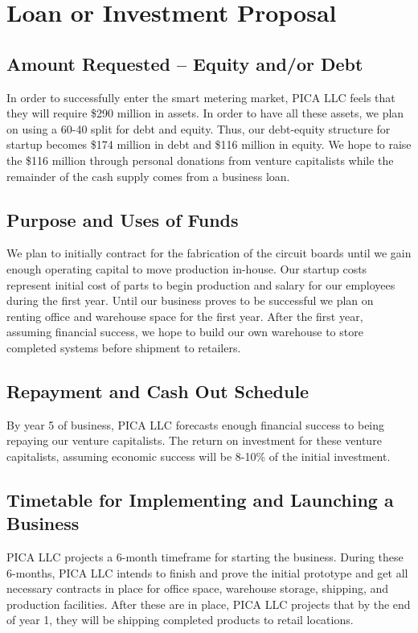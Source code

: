 \section{Loan or Investment Proposal}

\subsection{Amount Requested -- Equity and/or Debt}
In order to successfully enter the smart metering market, PICA LLC feels that they will require \$290 million in assets. In order to have all these assets, we plan on using a 60-40 split for debt and equity. Thus, our debt-equity structure for startup becomes \$174 million in debt and \$116 million in equity. We hope to raise the \$116 million through personal donations from venture capitalists while the remainder of the cash supply comes from a business loan.

\subsection{Purpose and Uses of Funds}
We plan to initially contract for the fabrication of the circuit boards until we gain enough operating capital to move production in-house. Our startup costs represent initial cost of parts to begin production and salary for our employees during the first year. Until our business proves to be successful we plan on renting office and warehouse space for the first year. After the first year, assuming financial success, we hope to build our own warehouse to store completed systems before shipment to retailers.

\subsection{Repayment and Cash Out Schedule}
By year 5 of business, PICA LLC forecasts enough financial success to being repaying our venture capitalists. The return on investment for these venture capitalists, assuming economic success will be 8-10\% of the initial investment.

\subsection{Timetable for Implementing and Launching a Business}
PICA LLC projects a 6-month timeframe for starting the business. During these 6-months, PICA LLC intends to finish and prove the initial prototype and get all necessary contracts in place for office space, warehouse storage, shipping, and production facilities. After these are in place, PICA LLC projects that by the end of year 1, they will be shipping completed products to retail locations.
